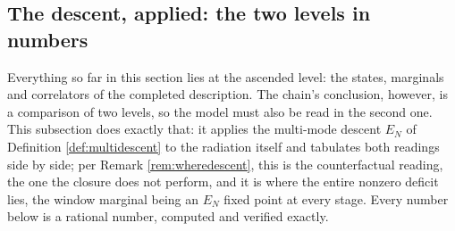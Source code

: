 \documentclass[11pt]{article}
\theoremstyle{definition}
\newcommand{\EN}{E_{N}}
\begin{document}
\subsection{The descent, applied: the two levels in numbers}\label{subsec:descentapplied}

Everything so far in this section lies at the ascended level: the states, marginals and correlators of the completed description. The chain's conclusion, however, is a comparison of two levels, so the model must also be read in the second one. This subsection does exactly that: it applies the multi-mode descent $\EN$ of Definition \ref{def:multidescent} to the radiation itself and tabulates both readings side by side; per Remark \ref{rem:wheredescent}, this is the counterfactual reading, the one the closure does not perform, and it is where the entire nonzero deficit lies, the window marginal being an $\EN$ fixed point at every stage. Every number below is a rational number, computed and verified exactly.
\end{document}
